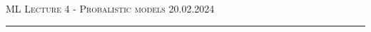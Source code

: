 \documentclass[12pt]{article}
\begin{document}
\thispagestyle{empty}

{\scshape ML } \hfill {\scshape \large Lecture 4 - Probalistic models} \hfill {\scshape 20.02.2024}
 
\smallskip
\hrule
\bigskip
\end{document}
